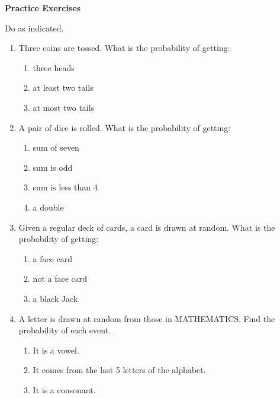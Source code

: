 \textbf{Practice Exercises}

\vspce

Do as indicated. 
\begin{enumerate}[label = \arabic*. ]
\item Three coins are tossed. What is the probability of getting:
\begin{enumerate}[label = \alph*. ]
\item three heads
\item at least two tails
\item at most two tails

\end{enumerate} 
\item A pair of dice is rolled. What is the probability of getting: 
\begin{enumerate}[label = \alph*. ]
\item sum of seven
\item sum is odd
\item sum is less than 4
\item a double 
\end{enumerate} 
\item Given a regular deck of cards, a card is drawn at random. What is the probability of getting:
\begin{enumerate}[label = \alph*. ]
\item a face card
\item not a face card
\item a black Jack
\end{enumerate} 
\item A letter is drawn at random from those in MATHEMATICS. Find the probability of each event.
\begin{enumerate}[label = \alph*. ]
\item It is a vowel. 
\item It comes from the last 5 letters of the alphabet. 
\item It is a consonant. 
\end{enumerate} 
 
\end{enumerate}   

 
